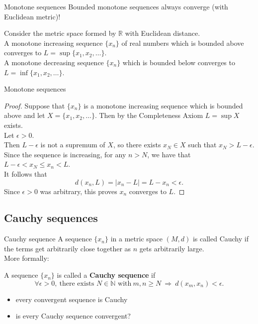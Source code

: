 \documentclass{beamer}
\begin{document}
\begin{frame}{Monotone sequences}
Bounded monotone sequences always converge (with Euclidean metric)!
\pause
\begin{thm}
\pause
Consider the metric space formed by $\mathbb{R}$ with Euclidean distance.\\
\pause
A monotone increasing sequence $\{x_n\}$ of real numbers which is bounded above converges to $L = \sup\{x_1,x_2,\dots\}$.\\
\pause
A monotone decreasing sequence $\{x_n\}$ which is bounded below converges to $L = \inf\{x_1,x_2,\dots\}$.
\end{thm}
\end{frame}

\begin{frame}{Monotone sequences}
\begin{proof}
\pause
Suppose that $\{x_n\}$ is a monotone increasing sequence which is bounded above and let $X = \{x_1,x_2,\dots\}$.
\pause
Then by the Completeness Axiom $L=\sup X$ exists.\\
\pause
Let $\epsilon > 0$.\\
\pause
Then $L-\epsilon$ is not a supremum of $X$, so there exists $x_N\in X$ such that $x_N > L-\epsilon$.\\
\pause
Since the sequence is increasing, for any $n >N$, we have that $L-\epsilon < x_N \leq x_n < L$.\\
\pause
It follows that
$$d(x_n,L) = |x_n-L| = L-x_n < \epsilon.$$
\pause
Since $\epsilon > 0$ was arbitrary, this proves $x_n$ converges to $L$.
\end{proof}
\end{frame}

\subsection{Cauchy sequences}

\begin{frame}{Cauchy sequence}
A sequence $\{x_n\}$ in a metric space $(M,d)$ is called Cauchy if the terms get arbitrarily close together as $n$ gets arbitrarily large.\\
\pause
More formally:
\pause
\begin{defn}
A sequence $\{x_n\}$ is called a \textbf{Cauchy sequence} if
$$\forall \epsilon > 0,\ \text{there exists $N\in\mathbb N$ with}\ m,n\geq N\ \Rightarrow\ d(x_m,x_n) < \epsilon.$$
\end{defn}
\begin{itemize}
\pause
\item every convergent sequence is Cauchy
\pause
\item is every Cauchy sequence convergent?
\end{itemize}
\end{frame}
\end{document}
